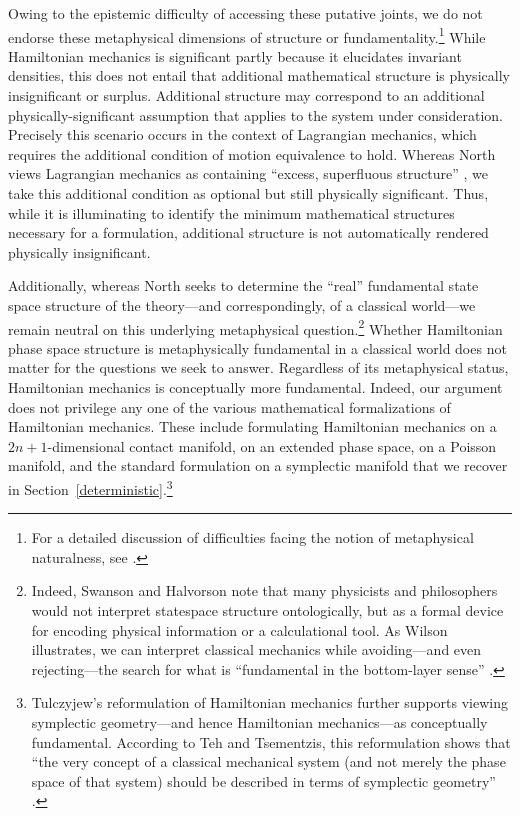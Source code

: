 \documentclass[12pt, twoside]{article}
\begin{document}
Owing to the epistemic difficulty of accessing these putative joints, we do not endorse these metaphysical dimensions of structure or fundamentality.\footnote{For a detailed discussion of difficulties facing the notion of metaphysical naturalness, see \textcites[]{Dorr_Hawthorne}.} While Hamiltonian mechanics is significant partly because it elucidates invariant densities, this does not entail that additional mathematical structure is physically insignificant or surplus. Additional structure may correspond to an additional physically-significant assumption that applies to the system under consideration. Precisely this scenario occurs in the context of Lagrangian mechanics, which requires the additional condition of motion equivalence to hold. Whereas North views Lagrangian mechanics as containing ``excess, superfluous structure'' \parencites*[75]{North}, we take this additional condition as optional but still physically significant. Thus, while it is illuminating to identify the minimum mathematical structures necessary for a formulation, additional structure is not automatically rendered physically insignificant. 

Additionally, whereas North \parencites*[76]{North} seeks to determine the ``real'' fundamental state space structure of the theory---and correspondingly, of a classical world---we remain neutral on this underlying metaphysical question.\footnote{Indeed, Swanson and Halvorson \parencites*[]{Swanson} note that many physicists and philosophers would not interpret statespace structure ontologically, but as a formal device for encoding physical information or a calculational tool. As Wilson illustrates, we can interpret classical mechanics while avoiding---and even rejecting---the search for what is ``fundamental in the bottom-layer sense'' \parencites*[53]{Wilson}.} Whether Hamiltonian phase space structure is metaphysically fundamental in a classical world does not matter for the questions we seek to answer. Regardless of its metaphysical status, Hamiltonian mechanics is conceptually more fundamental. Indeed, our argument does not privilege any one of the various mathematical formalizations of Hamiltonian mechanics. These include formulating Hamiltonian mechanics on a $2n+1$-dimensional contact manifold, on an extended phase space, on a Poisson manifold, and the standard formulation on a symplectic manifold that we recover in Section~\ref{deterministic}.\footnote{Tulczyjew's reformulation of Hamiltonian mechanics further supports viewing symplectic geometry---and hence Hamiltonian mechanics---as conceptually fundamental. According to Teh and Tsementzis, this reformulation shows that  ``the very concept of a classical mechanical system (and not merely the phase space of that system) should be described in terms of symplectic geometry'' \parencites*[46]{Teh}.}
\end{document}
